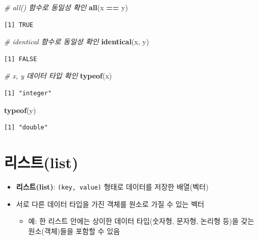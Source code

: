 \documentclass[
  11pt,
]{krantz}
\newenvironment{Shaded}{\begin{snugshade}}{\end{snugshade}}
\newcommand{\CommentTok}[1]{\textcolor[rgb]{0.37,0.37,0.37}{\textit{#1}}}
\newcommand{\KeywordTok}[1]{\textcolor[rgb]{0.27,0.27,0.27}{\textbf{#1}}}
\newcommand{\NormalTok}[1]{#1}
\newcommand{\OperatorTok}[1]{\textcolor[rgb]{0.43,0.43,0.43}{\textbf{#1}}}
\newcommand{\StringTok}[1]{\textcolor[rgb]{0.5,0.5,0.5}{#1}}
\providecommand{\tightlist}{%
  \setlength{\itemsep}{0pt}\setlength{\parskip}{0pt}}
\begin{document}
\begin{Shaded}
\begin{Highlighting}[]
\CommentTok{# all() 함수로 동일성 확인}
\KeywordTok{all}\NormalTok{(x }\OperatorTok{==}\StringTok{ }\NormalTok{y)}
\end{Highlighting}
\end{Shaded}

\begin{verbatim}
[1] TRUE
\end{verbatim}

\begin{Shaded}
\begin{Highlighting}[]
\CommentTok{# identical 함수로 동일성 확인}
\KeywordTok{identical}\NormalTok{(x, y)}
\end{Highlighting}
\end{Shaded}

\begin{verbatim}
[1] FALSE
\end{verbatim}

\begin{Shaded}
\begin{Highlighting}[]
\CommentTok{# x, y 데이터 타입 확인}
\KeywordTok{typeof}\NormalTok{(x)}
\end{Highlighting}
\end{Shaded}

\begin{verbatim}
[1] "integer"
\end{verbatim}

\begin{Shaded}
\begin{Highlighting}[]
\KeywordTok{typeof}\NormalTok{(y)}
\end{Highlighting}
\end{Shaded}

\begin{verbatim}
[1] "double"
\end{verbatim}

\normalsize

\hypertarget{list}{%
\section{리스트(list)}\label{list}}

\begin{itemize}
\tightlist
\item
  \textbf{리스트(list)}: \texttt{(key,\ value)} 형태로 데이터를 저장한 배열(벡터)
\item
  서로 다른 데이터 타입을 가진 객체를 원소로 가질 수 있는 벡터

  \begin{itemize}
  \tightlist
  \item
    예: 한 리스트 안에는 상이한 데이터 타입(숫자형, 문자형, 논리형 등)을 갖는 원소(객체)들을 포함할 수 있음
  \end{itemize}
\end{itemize}
\end{document}
